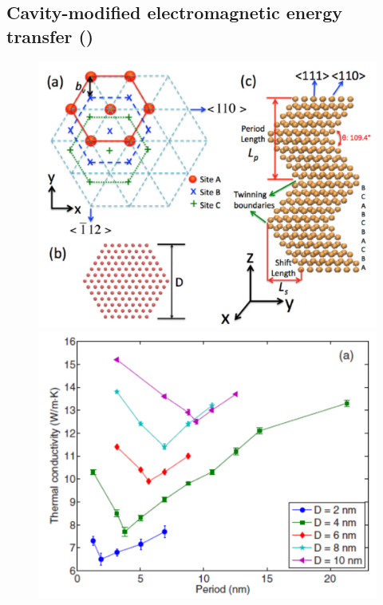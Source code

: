 \subsection{Cavity-modified electromagnetic energy transfer ()}





\begin{figure}[tb]
 \begin{center}
  \includegraphics[width=.49\columnwidth]{pics/twinning_fig1.pdf} 
  \includegraphics[width=.49\columnwidth]{pics/twinning_fig2a.pdf} 
  \caption{}  
\label{fig:twinning_fig1}
 \end{center}
\end{figure}

